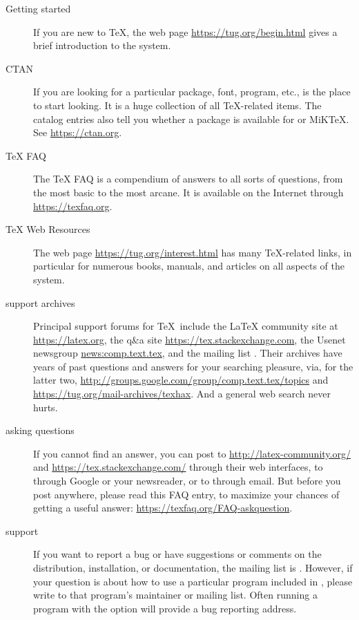 \documentclass{article}
\begin{document}
\begin{description}
\item [Getting started] If you are new to \TeX, the web page
\url{https://tug.org/begin.html} gives a brief introduction to the system.

\item [CTAN] If you are looking for a particular package, font, program,
etc., \CTAN{} is the place to start looking. It is a huge collection of
all \TeX{}-related items. The catalog entries also tell you whether a
package is available for \TL{} or MiK\TeX. See \url{https://ctan.org}.

\item [\TeX{} FAQ] The \TeX{} FAQ is a compendium of answers to all
sorts of questions, from the most basic to the most arcane. It is
available on the Internet through \url{https://texfaq.org}.

\item [\TeX{} Web Resources] The web page
\url{https://tug.org/interest.html} has many \TeX{}-related links, in
particular for numerous books, manuals, and articles on all aspects of
the system.

\item [support archives] Principal support forums for \TeX\ include
the \LaTeX{} community site at \url{https://latex.org}, the
q\&a site \url{https://tex.stackexchange.com}, the Usenet newsgroup
\url{news:comp.text.tex}, and the mailing list .
Their archives have years of past questions and answers for your
searching pleasure, via, for the latter two,
\url{http://groups.google.com/group/comp.text.tex/topics} and
\url{https://tug.org/mail-archives/texhax}.  And a general web search
never hurts.

\item [asking questions] If you cannot find an answer, you can post to 
\url{http://latex-community.org/} and
\url{https://tex.stackexchange.com/} through their web interfaces, to
 through Google or your newsreader, or to
 through email.  But before you post anywhere,
please read this FAQ entry, to maximize your chances of getting a useful
answer:
\url{https://texfaq.org/FAQ-askquestion}.

\item [\TL{} support] If you want to report a bug or have
suggestions or comments on the \TL{} distribution, installation, or
documentation, the mailing list is .  However,
if your question is about how to use a particular program included in
\TL{}, please write to that program's maintainer or
mailing list.  Often running a program with the  option
will provide a bug reporting address.

\end{description}
\end{document}
